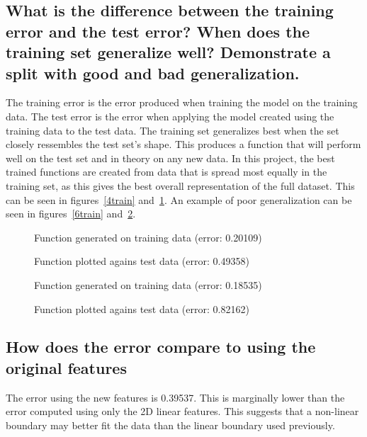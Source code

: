 \documentclass[titlepage]{scrartcl}
\begin{document}
\subsection{What is the difference between the training error and the test
    error? When does the training set generalize well? Demonstrate a split with
good and bad generalization.}
The training error is the error produced when training the model on the
training data. The test error is the error when applying the model created
using the training data to the test data.
The training set generalizes best when the set closely ressembles the test
set's shape. This produces a function that will perform well on the test set
and in theory on any new data. In this project, the best trained functions are
created from data that is spread most equally in the training set, as this
gives the best overall representation of the full dataset. This can be seen in
figures~\ref{4train} and~\ref{4test}. An example of poor generalization can be
seen in figures~\ref{6train} and~\ref{6test}.

\begin{figure}
    \caption{Function generated on training data (error: 0.20109)}
    \label{4train}
    \caption{Function plotted agains test data (error: 0.49358)}
    \label{4test}
\end{figure}
\begin{figure}
    \caption{Function generated on training data (error: 0.18535)}
    \label{6train}
    \caption{Function plotted agains test data (error: 0.82162)}
    \label{6test}
\end{figure}

\subsection{How does the error compare to using the original features}
The error using the new features is 0.39537. This is marginally lower than the
error computed using only the 2D linear features. This suggests that a
non-linear boundary may better fit the data than the linear boundary used
previously.



\end{document}
